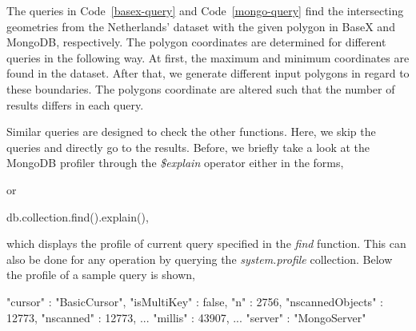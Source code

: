 \documentclass[a4paper,12pt]{article}
\begin{document}
The queries in Code~\ref{basex-query} and Code~\ref{mongo-query} find the intersecting geometries from the Netherlands' dataset with the given polygon in BaseX and MongoDB, respectively. The polygon coordinates are determined for different queries in the following way. At first, the maximum and minimum coordinates are found in the dataset. After that, we generate different input polygons in regard to these boundaries. The polygons coordinate are altered such that the number of results differs in each query.
\vspace{10px}
\vspace{10px}

Similar queries are designed to check the other functions. Here, we skip the queries and directly go to the results. Before, we briefly take a look at the MongoDB profiler through the \textit{\$explain} operator either in the forms,
\vspace{10px}
 or 
 \begin{fakeJSON}
db.collection.find().explain(),
 \end{fakeJSON}
\vspace{10px}
which displays the profile of current query specified in the \textit{find} function.
This can also be done for any operation by querying the \textit{system.profile} collection.
Below the profile of a sample query is shown,
\vspace{10px}
\begin{fakeJSON}
"cursor" : "BasicCursor",
"isMultiKey" : false,
"n" : 2756,
"nscannedObjects" : 12773,
"nscanned" : 12773,
...
"millis" : 43907,
...
"server" : "MongoServer"
\end{fakeJSON}
\vspace{10px}
\end{document}
